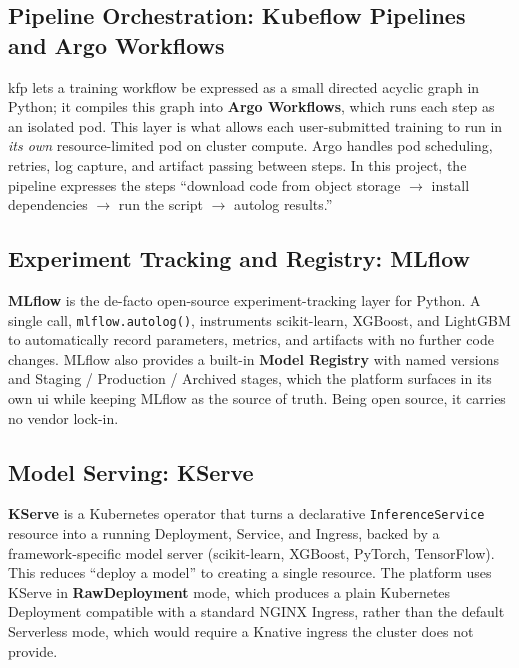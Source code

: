 
\subsection{Pipeline Orchestration: Kubeflow Pipelines and Argo Workflows}
\gls{kfp} lets a training workflow be expressed as a small directed acyclic graph
in Python; it compiles this graph into \textbf{Argo Workflows}, which runs each
step as an isolated pod. This layer is what allows each user-submitted training to
run in \emph{its own} resource-limited pod on cluster compute. Argo handles pod
scheduling, retries, log capture, and artifact passing between steps. In this
project, the pipeline expresses the steps ``download code from object storage
$\rightarrow$ install dependencies $\rightarrow$ run the script $\rightarrow$
autolog results.''


\subsection{Experiment Tracking and Registry: MLflow}
\textbf{MLflow} is the de-facto open-source experiment-tracking layer for Python.
A single call, \texttt{mlflow.autolog()}, instruments scikit-learn, XGBoost, and
LightGBM to automatically record parameters, metrics, and artifacts with no
further code changes. MLflow also provides a built-in \textbf{Model Registry} with
named versions and Staging / Production / Archived stages, which the platform
surfaces in its own \gls{ui} while keeping MLflow as the source of truth. Being
open source, it carries no vendor lock-in.


\subsection{Model Serving: KServe}
\textbf{KServe} is a Kubernetes operator that turns a declarative
\texttt{InferenceService} resource into a running Deployment, Service, and Ingress,
backed by a framework-specific model server (scikit-learn, XGBoost, PyTorch,
TensorFlow). This reduces ``deploy a model'' to creating a single resource. The
platform uses KServe in \textbf{RawDeployment} mode, which produces a plain
Kubernetes Deployment compatible with a standard NGINX Ingress, rather than the
default Serverless mode, which would require a Knative ingress the cluster does not
provide.

